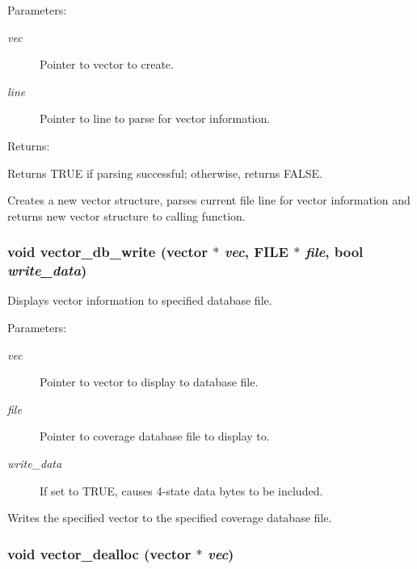\begin{Desc}
\item[Parameters: ]\par
\begin{description}
\item[{\em 
vec}]Pointer to vector to create. \item[{\em 
line}]Pointer to line to parse for vector information.\end{description}
\end{Desc}
\begin{Desc}
\item[Returns: ]\par
Returns TRUE if parsing successful; otherwise, returns FALSE.\end{Desc}
Creates a new vector structure, parses current file line for vector information and returns new vector structure to calling function. 
\subsubsection{\setlength{\rightskip}{0pt plus 5cm}void vector\_\-db\_\-write ({\bf vector} $\ast$ {\em vec}, FILE $\ast$ {\em file}, {\bf bool} {\em write\_\-data})}\label{vector_8h_a3}


Displays vector information to specified database file.

\begin{Desc}
\item[Parameters: ]\par
\begin{description}
\item[{\em 
vec}]Pointer to vector to display to database file. \item[{\em 
file}]Pointer to coverage database file to display to. \item[{\em 
write\_\-data}]If set to TRUE, causes 4-state data bytes to be included.\end{description}
\end{Desc}
Writes the specified vector to the specified coverage database file. 
\subsubsection{\setlength{\rightskip}{0pt plus 5cm}void vector\_\-dealloc ({\bf vector} $\ast$ {\em vec})}\label{vector_8h_a32}


